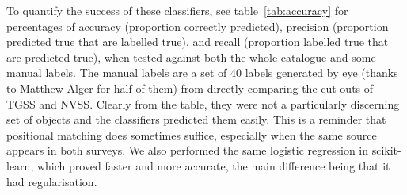 \documentclass[12pt,a4paper]{article}
\begin{document}
\begin{table}[ht]
\centering
{}
\caption{Accuracy percentages for logistic regressions against positional matching and manual labels, after training on half the catalogue. Showing pytorch results for the model with all features and for the model with all minus separation, as well as scikit-learn (sklearn) results using all features (see appendix~\ref{app:sklearn} for scikit-learn).}
\label{tab:accuracy}
\end{table}

To quantify the success of these classifiers, see table~\ref{tab:accuracy} for percentages of accuracy (proportion correctly predicted), precision (proportion predicted true that are labelled true), and recall (proportion labelled true that are predicted true), when tested against both the whole catalogue and some manual labels. The manual labels are a set of 40 labels generated by eye (thanks to Matthew Alger for half of them) from directly comparing the cut-outs of TGSS and NVSS. Clearly from the table, they were not a particularly discerning set of objects and the classifiers predicted them easily. This is a reminder that positional matching does sometimes suffice, especially when the same source appears in both surveys. We also performed the same logistic regression in scikit-learn, which proved faster and more accurate, the main difference being that it had regularisation.\\
\end{document}
